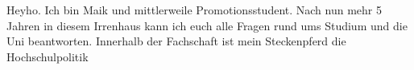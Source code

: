 \begin{multicols*}{2}
{Heyho. Ich bin Maik und mittlerweile Promotionsstudent. Nach nun mehr 5 Jahren in diesem Irrenhaus kann ich euch alle Fragen rund ums Studium und die Uni beantworten. Innerhalb der Fachschaft ist mein Steckenpferd die Hochschulpolitik}


\end{multicols*}
